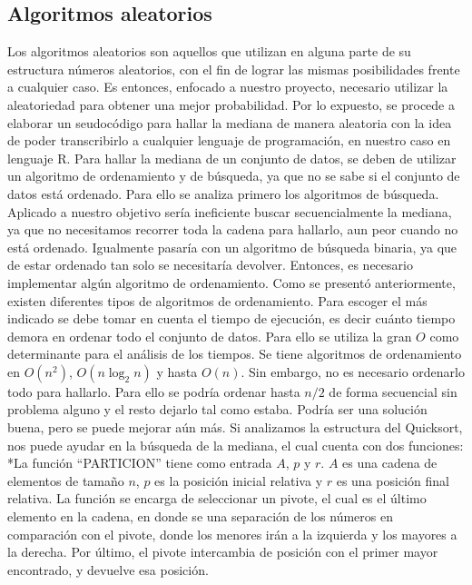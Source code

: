 \documentclass[final,a4paper,romanappendices]{IEEEtran}\usepackage[]{graphicx}\usepackage[]{color}
\theoremstyle{definition}
\begin{document}
\subsection{Algoritmos aleatorios}
Los algoritmos aleatorios son aquellos que utilizan en alguna parte de su estructura números aleatorios, con el fin de lograr las mismas posibilidades frente a cualquier caso. Es entonces, enfocado a nuestro proyecto, necesario utilizar la aleatoriedad para obtener una mejor probabilidad. Por lo expuesto, se procede a elaborar un seudocódigo para hallar la mediana de manera aleatoria con la idea de poder transcribirlo a cualquier lenguaje de programación, en nuestro caso en lenguaje R. Para hallar la mediana de un conjunto de datos, se deben de utilizar un algoritmo de ordenamiento y de búsqueda, ya que no se sabe si el conjunto de datos está ordenado. Para ello se analiza primero los algoritmos de búsqueda. Aplicado a nuestro objetivo sería ineficiente buscar secuencialmente la mediana, ya que no necesitamos recorrer toda la cadena para hallarlo, aun peor cuando no está ordenado. Igualmente pasaría con un algoritmo de búsqueda binaria, ya que de estar ordenado tan solo se necesitaría devolver. Entonces, es necesario implementar algún algoritmo de ordenamiento.
Como se presentó anteriormente, existen diferentes tipos de algoritmos de ordenamiento. Para escoger el más indicado se debe tomar en cuenta el tiempo de ejecución, es decir cuánto tiempo demora en ordenar todo el conjunto de datos. Para ello se utiliza la gran $O$ como determinante para el análisis de los tiempos. Se tiene algoritmos de ordenamiento en $O(n^2)$, $O(n\log_{2}n)$ y hasta $O(n)$.
Sin embargo, no es necesario ordenarlo todo para hallarlo. Para ello se podría ordenar hasta $n/2$ de forma secuencial sin problema alguno y el resto dejarlo tal como estaba. Podría ser una solución buena, pero se puede mejorar aún más. Si analizamos la estructura del Quicksort, nos puede ayudar en la búsqueda de la mediana, el cual cuenta con dos funciones:
*La función ``PARTICION'' tiene como entrada $A$, $p$ y $r$. $A$ es una cadena de elementos de tamaño $n$, $p$ es la posición inicial relativa y $r$ es una posición final relativa. La función se encarga de seleccionar un pivote, el cual es el último elemento en la cadena, en donde se una separación de los números en comparación con el pivote, donde los menores irán a la izquierda y los mayores a la derecha. Por último, el pivote intercambia de posición con el primer mayor encontrado, y devuelve esa posición.



\nocite{*}
\printbibliography
\end{document}
